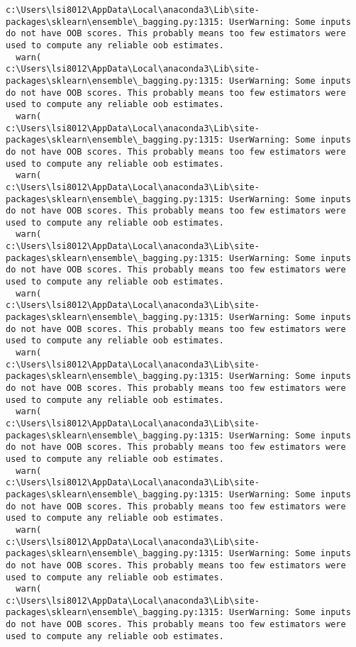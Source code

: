 \documentclass[
  letterpaper,
  DIV=11,
  numbers=noendperiod]{scrreprt}
\begin{document}
\begin{verbatim}
c:\Users\lsi8012\AppData\Local\anaconda3\Lib\site-packages\sklearn\ensemble\_bagging.py:1315: UserWarning: Some inputs do not have OOB scores. This probably means too few estimators were used to compute any reliable oob estimates.
  warn(
c:\Users\lsi8012\AppData\Local\anaconda3\Lib\site-packages\sklearn\ensemble\_bagging.py:1315: UserWarning: Some inputs do not have OOB scores. This probably means too few estimators were used to compute any reliable oob estimates.
  warn(
c:\Users\lsi8012\AppData\Local\anaconda3\Lib\site-packages\sklearn\ensemble\_bagging.py:1315: UserWarning: Some inputs do not have OOB scores. This probably means too few estimators were used to compute any reliable oob estimates.
  warn(
c:\Users\lsi8012\AppData\Local\anaconda3\Lib\site-packages\sklearn\ensemble\_bagging.py:1315: UserWarning: Some inputs do not have OOB scores. This probably means too few estimators were used to compute any reliable oob estimates.
  warn(
c:\Users\lsi8012\AppData\Local\anaconda3\Lib\site-packages\sklearn\ensemble\_bagging.py:1315: UserWarning: Some inputs do not have OOB scores. This probably means too few estimators were used to compute any reliable oob estimates.
  warn(
c:\Users\lsi8012\AppData\Local\anaconda3\Lib\site-packages\sklearn\ensemble\_bagging.py:1315: UserWarning: Some inputs do not have OOB scores. This probably means too few estimators were used to compute any reliable oob estimates.
  warn(
c:\Users\lsi8012\AppData\Local\anaconda3\Lib\site-packages\sklearn\ensemble\_bagging.py:1315: UserWarning: Some inputs do not have OOB scores. This probably means too few estimators were used to compute any reliable oob estimates.
  warn(
c:\Users\lsi8012\AppData\Local\anaconda3\Lib\site-packages\sklearn\ensemble\_bagging.py:1315: UserWarning: Some inputs do not have OOB scores. This probably means too few estimators were used to compute any reliable oob estimates.
  warn(
c:\Users\lsi8012\AppData\Local\anaconda3\Lib\site-packages\sklearn\ensemble\_bagging.py:1315: UserWarning: Some inputs do not have OOB scores. This probably means too few estimators were used to compute any reliable oob estimates.
  warn(
c:\Users\lsi8012\AppData\Local\anaconda3\Lib\site-packages\sklearn\ensemble\_bagging.py:1315: UserWarning: Some inputs do not have OOB scores. This probably means too few estimators were used to compute any reliable oob estimates.
  warn(
c:\Users\lsi8012\AppData\Local\anaconda3\Lib\site-packages\sklearn\ensemble\_bagging.py:1315: UserWarning: Some inputs do not have OOB scores. This probably means too few estimators were used to compute any reliable oob estimates.

\end{verbatim}
\end{document}
